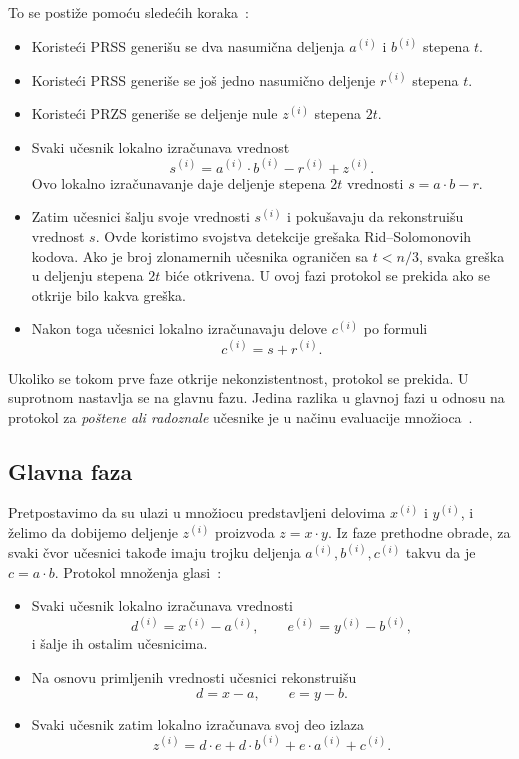To se postiže pomoću sledećih koraka~\cite{smart2016cryptography}:
\begin{itemize}
    \item Koristeći PRSS generišu se dva nasumična deljenja \(a^{(i)}\) i \(b^{(i)}\) stepena $t$.
    \item Koristeći PRSS generiše se još jedno nasumično deljenje \(r^{(i)}\) stepena $t$.
    \item Koristeći PRZS generiše se deljenje nule \(z^{(i)}\) stepena $2t$.
    \item Svaki učesnik lokalno izračunava vrednost
    \[ s^{(i)} = a^{(i)}\cdot b^{(i)} - r^{(i)} + z^{(i)}. \]
    Ovo lokalno izračunavanje daje deljenje stepena $2t$ vrednosti $s = a\cdot b - r$.

    \item Zatim učesnici šalju svoje vrednosti $s^{(i)}$ i pokušavaju da rekonstruišu
    vrednost $s$. Ovde koristimo svojstva detekcije grešaka Rid--Solomonovih kodova. Ako je
    broj zlonamernih učesnika ograničen sa $t < n/3$, svaka greška u deljenju stepena $2t$ biće
    otkrivena. U ovoj fazi protokol se prekida ako se otkrije bilo kakva greška.

    \item Nakon toga učesnici lokalno izračunavaju delove \(c^{(i)}\) po formuli
    \[ c^{(i)} = s + r^{(i)}. \]
\end{itemize}


Ukoliko se tokom prve faze otkrije nekonzistentnost, protokol se prekida. U suprotnom nastavlja se na glavnu fazu. Jedina razlika u glavnoj fazi u odnosu na protokol za \emph{poštene ali radoznale} učesnike je u načinu evaluacije množioca~\cite{smart2016cryptography}.

\subsection{Glavna faza}

Pretpostavimo da su ulazi u množiocu predstavljeni delovima \(x^{(i)}\) i \(y^{(i)}\), i želimo da dobijemo deljenje \(z^{(i)}\) proizvoda \(z = x\cdot y\). Iz faze prethodne obrade, za svaki čvor učesnici takođe imaju trojku deljenja \(a^{(i)}, b^{(i)}, c^{(i)}\) takvu da je \(c = a\cdot b\). Protokol množenja glasi~\cite{smart2016cryptography}:
\begin{itemize}
    \item Svaki učesnik lokalno izračunava vrednosti
    \[
    d^{(i)} = x^{(i)} - a^{(i)}, \qquad
    e^{(i)} = y^{(i)} - b^{(i)},
    \]
    i šalje ih ostalim učesnicima.

    \item Na osnovu primljenih vrednosti učesnici rekonstruišu
    \[
    d = x - a, \qquad
    e = y - b.
    \]

    \item Svaki učesnik zatim lokalno izračunava svoj deo izlaza
    \[
    z^{(i)} = d\cdot e + d\cdot b^{(i)} + e\cdot a^{(i)} + c^{(i)}.
    \]
\end{itemize}

